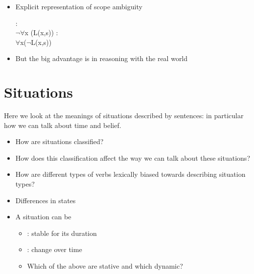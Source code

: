 \documentclass[headrule,footrule]{foils}
\begin{document}
\MyLogo{}

\begin{itemize}
\item Explicit representation of scope ambiguity
  \begin{exe}
    \ex {}
    \begin{xlist}
          \ex {}:  
          \\ $\neg\forall$x (L(x,s))
          \ex {}: 
          \\ $\forall$x($\neg$L(x,s))
    \end{xlist}
  \end{exe}
\item But the big advantage is in reasoning with the real world
   \\ 
\end{itemize}
 




\section{Situations}



Here we look at the meanings of situations described by sentences: 
in particular how we can talk about time and belief.

 \begin{itemize}
 \item  How are situations classified?
 \item  How does this classification affect the way we can talk 
   about these situations?
 \item  How are different types of verbs lexically biased  
   towards describing situation types?
 \end{itemize}


\begin{itemize}
\item  Differences in states  
  \begin{exe}
    \ex {}
    \ex {}
    \ex {}
    \ex {}
  \end{exe}
\item  A situation can be 
  \begin{itemize}
  \item  {}: stable for its duration
  \item  {}: change over time
  \item  Which of the above are stative and which dynamic?    
  \end{itemize}
\end{itemize}
\end{document}

